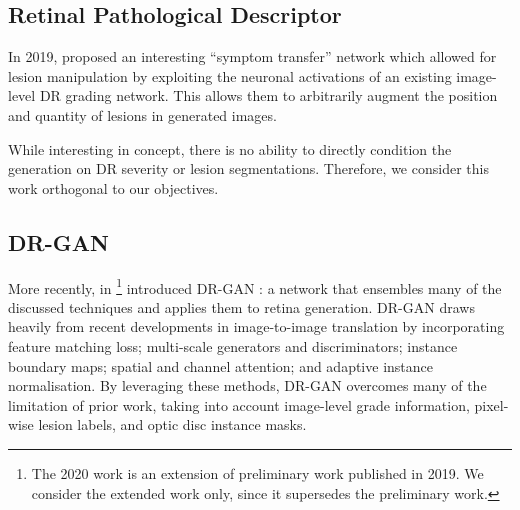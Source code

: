 \subsection{Retinal Pathological Descriptor}

In 2019, \citeauthor{Niu_2019} \cite{Niu_2019} proposed an interesting ``symptom transfer'' network which allowed for lesion manipulation by exploiting the neuronal activations of an existing image-level DR grading network. 
This allows them to arbitrarily augment the position and quantity of lesions in generated images.

While interesting in concept, there is no ability to directly condition the generation on DR severity or lesion segmentations.
Therefore, we consider this work orthogonal to our objectives.

\subsection{DR-GAN}

More recently, in \citeyear{Zhou_2020}\footnote{The 2020 work is an extension of preliminary work published in 2019.
We consider the extended work only, since it supersedes the preliminary work.} \citeauthor{Zhou_2020} introduced DR-GAN \cite{Zhou_2020}: a network that ensembles many of the discussed techniques and applies them to retina generation.
DR-GAN draws heavily from recent developments in image-to-image translation by incorporating feature matching loss; multi-scale generators and discriminators; instance boundary maps; spatial and channel attention; and adaptive instance normalisation.
By leveraging these methods, DR-GAN overcomes many of the limitation of prior work, taking into account image-level grade information, pixel-wise lesion labels, and optic disc instance masks.

